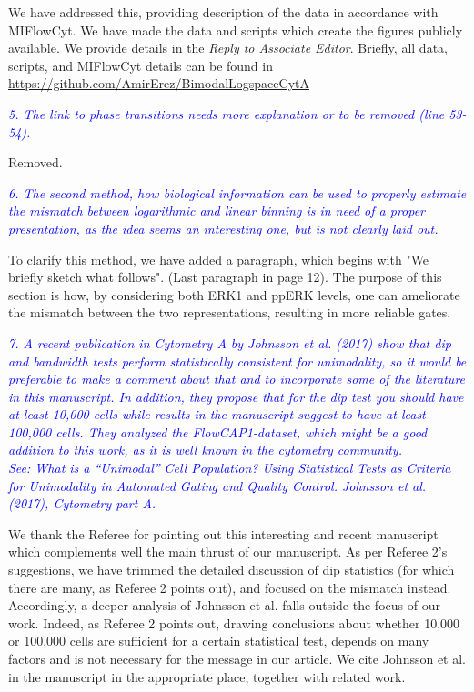 \documentclass[letter,11pt,draft]{article}
\newcommand{\re}[1]{\emph{\textcolor{blue}{#1}}}
\begin{document}
\smallskip
We have addressed this, providing description of the data in accordance with MIFlowCyt. We have made the data and scripts which create the figures publicly available. We provide details in the \emph{Reply to Associate Editor}. Briefly, all data, scripts, and MIFlowCyt details can be found in
\href{https://github.com/AmirErez/BimodalLogspaceCytA}{https://github.com/AmirErez/BimodalLogspaceCytA}

\smallskip
\re{5. The link to phase transitions needs more explanation or to be removed (line 53-54).}

\smallskip
Removed.

\re{6. The second method, how biological information can be used to properly estimate the mismatch between logarithmic and linear binning is in need of a proper presentation, as the idea seems an interesting one, but is not clearly laid out.}

\smallskip
To clarify this method, we have added a paragraph, which begins with "We briefly sketch what follows". (Last paragraph in page 12).
The purpose of this section is how, by considering both ERK1 and ppERK levels, one can ameliorate the mismatch between the two representations, resulting in more reliable gates. 

\re{7. A recent publication in Cytometry A by Johnsson et al. (2017) show that dip and bandwidth tests perform statistically consistent for unimodality, so it would be preferable to make a comment about that and to incorporate some of the literature in this manuscript. In addition, they propose that for the dip test you should have at least 10,000 cells while results in the manuscript suggest to have at least 100,000 cells. They analyzed the FlowCAP1-dataset, which might be a good addition to this work, as it is well known in the cytometry community.}
\\ 
\re{See: What is a “Unimodal” Cell Population? Using Statistical Tests as Criteria for Unimodality in Automated Gating and Quality Control. Johnsson et al. (2017), Cytometry part A.}

\smallskip
We thank the Referee for pointing out this interesting and recent manuscript which complements well the main thrust of our manuscript. As per Referee 2's suggestions, we have trimmed the detailed discussion of dip statistics (for which there are many, as Referee 2 points out), and focused on the mismatch instead. Accordingly, a deeper analysis of Johnsson et al. falls outside the focus of our work. Indeed, as Referee 2 points out, drawing conclusions about whether 10,000 or 100,000 cells are sufficient for a certain statistical test, depends on many factors and is not necessary for the message in our article. We cite Johnsson et al. in the manuscript in the appropriate place, together with related work. 
\end{document}
